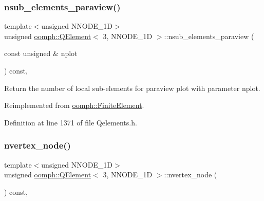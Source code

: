 \subsubsection{\texorpdfstring{nsub\+\_\+elements\+\_\+paraview()}{nsub\_elements\_paraview()}}
{\footnotesize\ttfamily template$<$unsigned N\+N\+O\+D\+E\+\_\+1D$>$ \\
unsigned \hyperlink{classoomph_1_1QElement}{oomph\+::\+Q\+Element}$<$ 3, N\+N\+O\+D\+E\+\_\+1D $>$\+::nsub\+\_\+elements\+\_\+paraview (\begin{DoxyParamCaption}\item[{const unsigned \&}]{nplot }\end{DoxyParamCaption}) const\hspace{0.3cm}{\ttfamily [inline]}, {\ttfamily [virtual]}}



Return the number of local sub-\/elements for paraview plot with parameter nplot. 



Reimplemented from \hyperlink{classoomph_1_1FiniteElement_aa1e11deffc8ee67adaa59ce3ade0579f}{oomph\+::\+Finite\+Element}.



Definition at line 1371 of file Qelements.\+h.

\mbox{\label{classoomph_1_1QElement_3_013_00_01NNODE__1D_01_4_a70472a8a3a9cd44d853c70b631062e9c}} 
\subsubsection{\texorpdfstring{nvertex\+\_\+node()}{nvertex\_node()}}
{\footnotesize\ttfamily template$<$unsigned N\+N\+O\+D\+E\+\_\+1D$>$ \\
unsigned \hyperlink{classoomph_1_1QElement}{oomph\+::\+Q\+Element}$<$ 3, N\+N\+O\+D\+E\+\_\+1D $>$\+::nvertex\+\_\+node (\begin{DoxyParamCaption}{ }\end{DoxyParamCaption}) const\hspace{0.3cm}{\ttfamily [inline]}, {\ttfamily [virtual]}}



